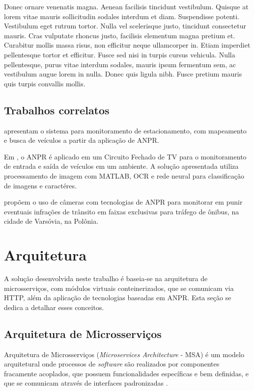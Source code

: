 \documentclass[12pt]{article}
\begin{document}
Donec ornare venenatis magna. Aenean facilisis tincidunt vestibulum. Quisque at lorem vitae mauris sollicitudin sodales interdum et diam. Suspendisse potenti. Vestibulum eget rutrum tortor. Nulla vel scelerisque justo, tincidunt consectetur mauris. Cras vulputate rhoncus justo, facilisis elementum magna pretium et. Curabitur mollis massa risus, non efficitur neque ullamcorper in. Etiam imperdiet pellentesque tortor et efficitur. Fusce sed nisi in turpis cursus vehicula. Nulla pellentesque, purus vitae interdum sodales, mauris ipsum fermentum sem, ac vestibulum augue lorem in nulla. Donec quis ligula nibh. Fusce pretium mauris quis turpis convallis mollis. 

\subsection{Trabalhos correlatos}

 apresentam o sistema para monitoramento de estacionamento, com mapeamento e busca de veículos a partir da aplicação de ANPR.

Em , o ANPR é aplicado em um Circuito Fechado de TV para o monitoramento de entrada e saída de veículos em um ambiente. A solução apresentada utiliza processamento de imagem com MATLAB, OCR e rede neural para classificação de imagens e caractéres.

 propõem o uso de câmeras com tecnologias de ANPR para monitorar em punir eventuais infrações de trânsito em faixas exclusivas para tráfego de ônibus, na cidade de Varsóvia, na Polônia.

\section{Arquitetura} \label{sec:architecture}

A solução desenvolvida neste trabalho é baseia-se na arquitetura de microsserviços, com módulos virtuais conteinerizados, que se comunicam via HTTP, além da aplicação de tecnologias baseadas em ANPR. Esta seção se dedica a detalhar esses conceitos.

\subsection{Arquitetura de Microsserviços}

Arquitetura de Microsserviços (\textit{Microservices Architecture} - MSA) é um modelo arquitetural onde processos de \textit{software} são realizados por componentes fracamente acoplados, que possuem funcionalidades específicas e bem definidas, e que se comunicam através de interfaces padronizadas \cite{viggiato2018}.
\end{document}
